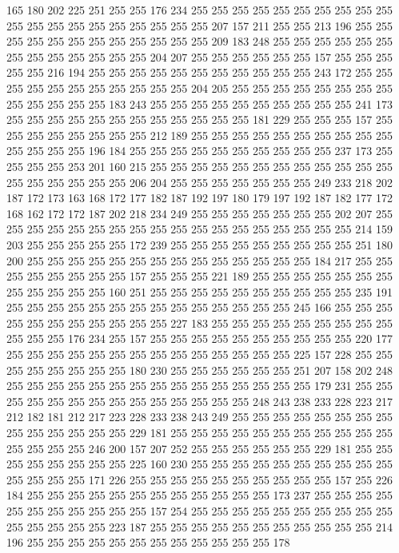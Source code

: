 165 180 202 225 251 255 255 176 234 255 255 255 255 255 255 255 255 255 255 255
255 255 255 255 255 255 255 255 255 207 157 211 255 255 213 196 255 255 255 255
255 255 255 255 255 255 255 255 209 183 248 255 255 255 255 255 255 255 255 255
255 255 255 255 204 207 255 255 255 255 255 255 157 255 255 255 255 255 216 194
255 255 255 255 255 255 255 255 255 255 255 243 172 255 255 255 255 255 255 255
255 255 255 255 204 205 255 255 255 255 255 255 255 255 255 255 255 255 255 183
243 255 255 255 255 255 255 255 255 255 255 241 173 255 255 255 255 255 255 255
255 255 255 255 255 181 229 255 255 255 157 255 255 255 255 255 255 255 255 212
189 255 255 255 255 255 255 255 255 255 255 255 255 255 255 196 184 255 255 255
255 255 255 255 255 255 255 237 173 255 255 255 255 253 201 160 215 255 255 255
255 255 255 255 255 255 255 255 255 255 255 255 255 255 255 206 204 255 255 255
255 255 255 255 249 233 218 202 187 172 173 163 168 172 177 182 187 192 197 180
179 197 192 187 182 177 172 168 162 172 172 187 202 218 234 249 255 255 255 255
255 255 255 202 207 255 255 255 255 255 255 255 255 255 255 255 255 255 255 255
255 255 255 214 159 203 255 255 255 255 255 172 239 255 255 255 255 255 255 255
255 255 251 180 200 255 255 255 255 255 255 255 255 255 255 255 255 255 255 184
217 255 255 255 255 255 255 255 255 157 255 255 255 221 189 255 255 255 255 255
255 255 255 255 255 255 255 160 251 255 255 255 255 255 255 255 255 255 255 235
191 255 255 255 255 255 255 255 255 255 255 255 255 255 255 245 166 255 255 255
255 255 255 255 255 255 255 255 227 183 255 255 255 255 255 255 255 255 255 255
255 255 176 234 255 157 255 255 255 255 255 255 255 255 255 255 220 177 255 255
255 255 255 255 255 255 255 255 255 255 255 255 225 157 228 255 255 255 255 255
255 255 255 180 230 255 255 255 255 255 255 251 207 158 202 248 255 255 255 255
255 255 255 255 255 255 255 255 255 255 255 179 231 255 255 255 255 255 255 255
255 255 255 255 255 255 255 248 243 238 233 228 223 217 212 182 181 212 217 223
228 233 238 243 249 255 255 255 255 255 255 255 255 255 255 255 255 255 255 229
181 255 255 255 255 255 255 255 255 255 255 255 255 255 255 255 246 200 157 207
252 255 255 255 255 255 255 229 181 255 255 255 255 255 255 255 255 225 160 230
255 255 255 255 255 255 255 255 255 255 255 255 255 255 171 226 255 255 255 255
255 255 255 255 255 255 157 255 226 184 255 255 255 255 255 255 255 255 255 255
255 255 173 237 255 255 255 255 255 255 255 255 255 255 255 157 254 255 255 255
255 255 255 255 255 255 255 255 255 255 255 255 223 187 255 255 255 255 255 255
255 255 255 255 255 214 196 255 255 255 255 255 255 255 255 255 255 255 255 178
